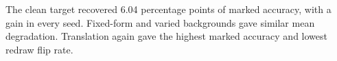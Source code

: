 The clean target recovered 6.04 percentage points of marked accuracy, with a gain in every seed. Fixed-form and varied backgrounds gave similar mean degradation. Translation again gave the highest marked accuracy and lowest redraw flip rate.
